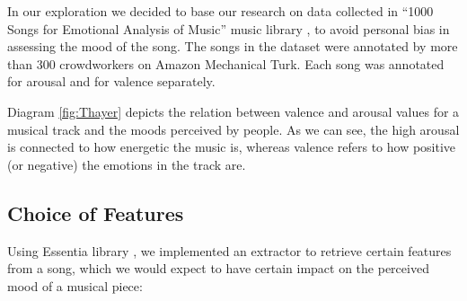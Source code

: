 In our exploration we decided to base our research on data collected in ``1000 Songs for Emotional Analysis of Music'' music library \cite{1000songs}, to avoid personal bias in assessing the mood of the song. The songs in the dataset were annotated by more than 300 crowdworkers on Amazon Mechanical Turk. Each song was annotated for arousal and for valence separately.

Diagram \ref{fig:Thayer} depicts the relation between valence and arousal values for a musical track and the moods perceived by people. As we can see, the high arousal is connected to how energetic the music is, whereas valence refers to how positive (or negative) the emotions in the track are. 

\vspace{10pt}

\subsection{Choice of Features}
Using Essentia library \cite{essentia}, we implemented an extractor to retrieve certain features from a song, which we would expect to have certain impact on the perceived mood of a musical piece:
